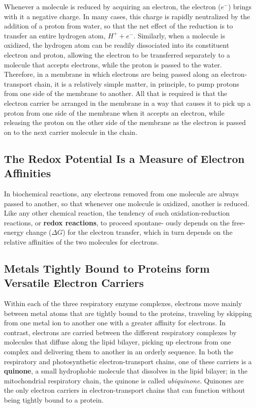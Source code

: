 Whenever a molecule is reduced by acquiring an electron, the electron
($e^{-}$) brings with it a negative charge. In many cases, this charge is rapidly
neutralized by the addition of a proton from water, so that the net effect
of the reduction is to transfer an entire hydrogen atom, $H^{+} + e^{-}$.
Similarly, when a molecule is oxidized, the hydrogen atom can
be readily dissociated into its constituent electron and proton, allowing
the electron to be transferred separately to a molecule that accepts electrons,
while the proton is passed to the water. Therefore, in a membrane
in which electrons are being passed along an electron-transport chain,
it is a relatively simple matter, in principle, to pump protons from one
side of the membrane to another. All that is required is that the electron
carrier be arranged in the membrane in a way that causes it to pick up a
proton from one side of the membrane when it accepts an electron, while
releasing the proton on the other side of the membrane as the electron is
passed on to the next carrier molecule in the chain.

\subsection{The Redox Potential Is a Measure of Electron Affinities}

In biochemical reactions, any electrons removed from one molecule are
always passed to another, so that whenever one molecule is oxidized,
another is reduced. Like any other chemical reaction, the tendency of such
oxidation-reduction reactions, or \textbf{redox reactions}, to proceed spontane-
ously depends on the free-energy change ($\Delta G$) for the electron transfer,
which in turn depends on the relative affinities of the two molecules for
electrons.


\subsection{Metals Tightly Bound to Proteins form Versatile Electron Carriers}

Within each of the three respiratory enzyme complexes, electrons move
mainly between metal atoms that are tightly bound to the proteins,
traveling by skipping from one metal ion to another one with a greater
affinity for electrons. In contrast, electrons are carried between the different
respiratory complexes by molecules that diffuse along the lipid bilayer,
picking up electrons from one complex and delivering them to another in
an orderly sequence. In both the respiratory and photosynthetic electron-transport
chains, one of these carriers is a \textbf{quinone}, a small hydrophobic
molecule that dissolves in the lipid bilayer; in the mitochondrial respiratory
chain, the quinone is called \textit{ubiquinone}. Quinones are the only
electron carriers in electron-transport chains that can function without
being tightly bound to a protein.


